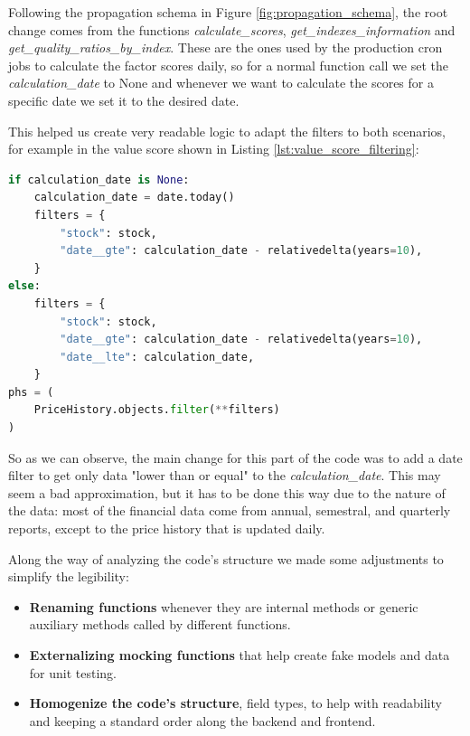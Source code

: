\documentclass[11pt,english,a4paper,hidelinks]{book}
\begin{document}
\vspace{0.5cm}
\noindent Following the propagation schema in Figure \ref{fig:propagation_schema}, the root change comes from the functions \textit{calculate\_scores}, \textit{get\_indexes\_information} and \textit{get\_quality\_ratios\_by\_index}. These are the ones used by the production cron jobs to calculate the factor scores daily, so for a normal function call we set the \textit{calculation\_date} to None and whenever we want to calculate the scores for a specific date we set it to the desired date. 

\vspace{0.5cm}
\noindent This helped us create very readable logic to adapt the filters to both scenarios, for example in the value score shown in Listing \ref{lst:value_score_filtering}:

\begin{lstlisting}[language=Python, caption={Value Score Filtering}, label={lst:value_score_filtering}]
if calculation_date is None:
    calculation_date = date.today()
    filters = {
        "stock": stock,
        "date__gte": calculation_date - relativedelta(years=10),
    }
else:
    filters = {
        "stock": stock,
        "date__gte": calculation_date - relativedelta(years=10),
        "date__lte": calculation_date,
    }
phs = (
    PriceHistory.objects.filter(**filters)
)
\end{lstlisting}

\noindent So as we can observe, the main change for this part of the code was to add a date filter to get only data "lower than or equal" to the \textit{calculation\_date}. This may seem a bad approximation, but it has to be done this way due to the nature of the data: most of the financial data come from annual, semestral, and quarterly reports, except to the price history that is updated daily.

\vspace{0.5cm}
\noindent Along the way of analyzing the code's structure we made some adjustments to simplify the legibility:
\begin{itemize}
    \item \textbf{Renaming functions} whenever they are internal methods or generic auxiliary methods called by different functions.
    \item \textbf{Externalizing mocking functions} that help create fake models and data for unit testing.
    \item \textbf{Homogenize the code's structure}, field types, to help with readability and keeping a standard order along the backend and frontend.
\end{itemize}
\end{document}
